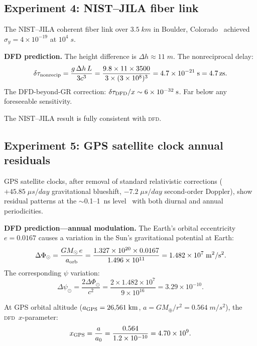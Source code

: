 \documentclass[aps,prd,twocolumn,superscriptaddress,nofootinbib,longbibliography]{revtex4-2}
\newcommand{\DFD}{\textsc{dfd}}
\newcommand{\zs}{\,\mathrm{zs}}
\begin{document}
\subsection{Experiment 4: NIST--JILA fiber link}\label{sec:NIST-JILA}

The NIST--JILA coherent fiber link over $3.5\;\si{km}$ in
Boulder, Colorado~\cite{Sinclair2019} achieved $\sigma_y = 4\times10^{-19}$
at $10^4\;\si{s}$.

\textbf{DFD prediction.} The height difference is $\Delta h \approx 11\;\si{m}$.
The nonreciprocal delay:
\begin{equation}
\delta\tau_{\rm nonrecip} = \frac{g\,\Delta h\,L}{3c^3}
= \frac{9.8\times 11\times 3500}{3\times(3\times10^8)^3}
= 4.7\times10^{-21}\;\si{s} = 4.7\zs.
\end{equation}
The DFD-beyond-GR correction: $\delta\tau_{\rm DFD}/x \sim 6\times10^{-32}\;\si{s}$.
Far below any foreseeable sensitivity.

The NIST--JILA result is fully consistent with \DFD.

\subsection{Experiment 5: GPS satellite clock annual residuals}\label{sec:GPS-annual}

GPS satellite clocks, after removal of standard relativistic corrections
($+45.85\;\si{\mu s/day}$ gravitational blueshift, $-7.2\;\si{\mu s/day}$
second-order Doppler), show residual patterns at the
$\sim$0.1--1~ns level~\cite{Senior2008,Galleani2008} with both diurnal
and annual periodicities.

\textbf{DFD prediction---annual modulation.}
The Earth's orbital eccentricity $e = 0.0167$ causes a variation in
the Sun's gravitational potential at Earth:
\begin{equation}
\Delta\Phi_\odot = \frac{GM_\odot\,e}{a_{\rm orb}}
= \frac{1.327\times10^{20}\times 0.0167}{1.496\times10^{11}}
= 1.482\times10^7\;\si{m^2/s^2}.
\end{equation}
The corresponding $\psi$ variation:
\begin{equation}
\Delta\psi_\odot = \frac{2\Delta\Phi_\odot}{c^2}
= \frac{2\times1.482\times10^7}{9\times10^{16}} = 3.29\times10^{-10}.
\end{equation}

At GPS orbital altitude ($a_{\rm GPS} = 26{,}561\;\si{km}$,
$a = GM_\oplus/r^2 = 0.564\;\si{m/s^2}$), the \DFD\ $x$-parameter:
\begin{equation}
x_{\rm GPS} = \frac{a}{a_0} = \frac{0.564}{1.2\times10^{-10}} = 4.70\times10^{9}.
\end{equation}
\end{document}
